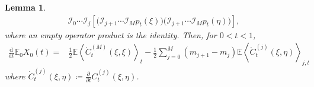 \documentclass[11pt]{article}
\newtheorem{lemma}[theorem]{Lemma}
\numberwithin{equation}{section}
\newcommand{\E}{\mathbb{E}}
\newcommand{\1}{\mathbf 1}
\begin{document}
\begin{lemma}
\begin{align*}
\mathcal I_0\cdots\mathcal I_j\left[
\bigl(\mathcal I_{j+1}\cdots\mathcal I_Mp_t(\xi)\bigr)
\bigl(\mathcal I_{j+1}\cdots\mathcal I_Mp_t(\eta)\bigr)
\right],
\end{align*}
where an empty operator product is the identity.  Then, for $0<t<1$,
\begin{equation}
\begin{aligned}
\frac{\mathrm d}{\mathrm dt} \E_0X_0(t)
={}&\frac1{2}\E\left\langle
\dot C_t^{(M)}(\xi,\xi)
\right\rangle_t-\frac1{2}\sum_{j=0}^M(m_{j+1}-m_j)
\E\left\langle
\dot C_t^{(j)}(\xi,\eta)
\right\rangle_{j,t}
\end{aligned}
\label{eq:finite-step-interpolation-derivative}
\end{equation}
where $\dot C_t^{(j)}(\xi,\eta) \coloneqq \frac{\partial}{\partial t} C_t^{(j)}(\xi,\eta)$.
\end{lemma}
\end{document}
